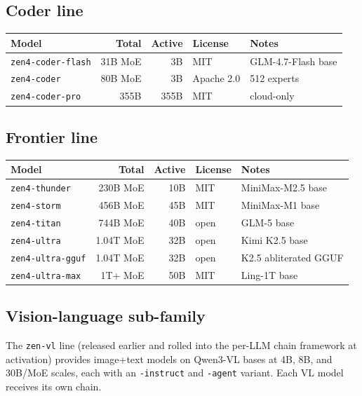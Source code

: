 \subsection{Coder line}

\begin{longtable}{p{3.5cm}rrlp{4cm}}
\toprule
\textbf{Model} & \textbf{Total} & \textbf{Active} & \textbf{License} & \textbf{Notes} \\
\midrule
\endhead
\texttt{zen4-coder-flash} & 31B MoE & 3B & MIT & GLM-4.7-Flash base \\
\texttt{zen4-coder} & 80B MoE & 3B & Apache 2.0 & 512 experts \\
\texttt{zen4-coder-pro} & 355B & 355B & MIT & cloud-only \\
\bottomrule
\end{longtable}

\subsection{Frontier line}

\begin{longtable}{p{3.5cm}rrlp{4cm}}
\toprule
\textbf{Model} & \textbf{Total} & \textbf{Active} & \textbf{License} & \textbf{Notes} \\
\midrule
\endhead
\texttt{zen4-thunder} & 230B MoE & 10B & MIT & MiniMax-M2.5 base \\
\texttt{zen4-storm} & 456B MoE & 45B & MIT & MiniMax-M1 base \\
\texttt{zen4-titan} & 744B MoE & 40B & open & GLM-5 base \\
\texttt{zen4-ultra} & 1.04T MoE & 32B & open & Kimi K2.5 base \\
\texttt{zen4-ultra-gguf} & 1.04T MoE & 32B & open & K2.5 abliterated GGUF \\
\texttt{zen4-ultra-max} & 1T+ MoE & 50B & MIT & Ling-1T base \\
\bottomrule
\end{longtable}

\subsection{Vision-language sub-family}

The \texttt{zen-vl} line (released earlier and rolled into the per-LLM chain framework at activation) provides image+text models on Qwen3-VL bases at 4B, 8B, and 30B/MoE scales, each with an \texttt{-instruct} and \texttt{-agent} variant. Each VL model receives its own chain.

